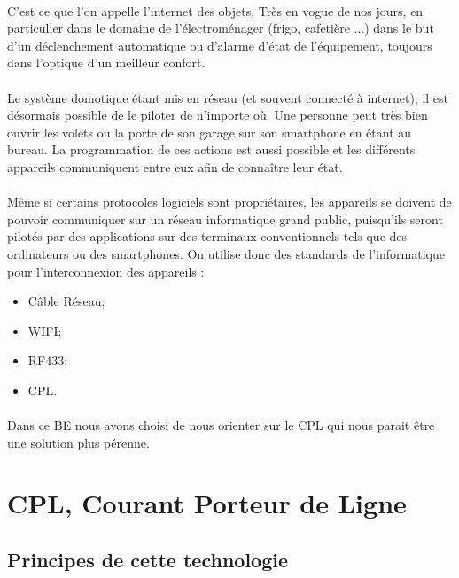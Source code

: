         \paragraph{}
C’est ce que l’on appelle l’internet des objets.
Très en vogue de nos jours, en particulier dans le domaine de l’électroménager (frigo, cafetière ...)
dans le but d'un déclenchement automatique ou d'alarme d'état de l'équipement, toujours dans l’optique d’un meilleur confort.
        \paragraph{}
Le système domotique étant mis en réseau (et souvent connecté à internet), il est désormais possible de le piloter de n’importe où.
Une personne peut très bien ouvrir les volets ou la porte de son garage sur son smartphone en étant au bureau.
La programmation de ces actions est aussi possible et les différents appareils communiquent entre eux afin de connaître leur état.
        \paragraph{}
Même si certains protocoles logiciels sont propriétaires, les appareils se doivent de pouvoir communiquer sur un réseau informatique grand public,
puisqu’ils seront pilotés par des applications sur des terminaux conventionnels tels que des ordinateurs ou des smartphones.
On utilise donc des standards de l’informatique pour l’interconnexion des appareils :
            \begin{itemize}
                \item Câble Réseau;
                \item WIFI;
                \item RF433;
                \item CPL.
            \end{itemize}
        \paragraph{}
Dans ce BE nous avons choisi de nous orienter sur le CPL qui nous parait être une solution plus pérenne.


    \clearpage
    \section{CPL, Courant Porteur de Ligne}
        \subsection{Principes de cette technologie}
